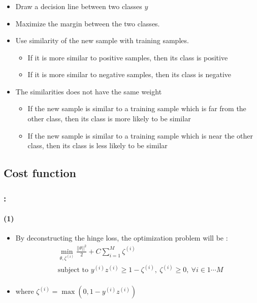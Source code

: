 \documentclass[xcolor=table]{beamer}
\begin{document}
\begin{frame}
	\frametitle{\insertshortsubtitle}
	\framesubtitle{\insertsection}
	
	\begin{minipage}{0.70\textwidth} 
		\begin{itemize}
			\item Draw a decision line between two classes $ y $ 
			\item Maximize the margin between the two classes.
			\item Use similarity of the new sample with training samples. 
			\begin{itemize}
				\item If it is more similar to positive samples, then its class is positive
				\item If it is more similar to negative samples, then its class is negative
			\end{itemize}
			\item The similarities does not have the same weight
			\begin{itemize}
				\item If the new sample is similar to a training sample which is far from the other class, then its class is more likely to be similar
				\item If the new sample is similar to a training sample which is near the other class, then its class is less likely to be similar
			\end{itemize}
		\end{itemize}
	\end{minipage}
	\begin{minipage}{0.29\textwidth} 
	\end{minipage}
	
	
\end{frame}


\subsection{Cost function}

\begin{frame}
	\frametitle{\insertshortsubtitle: \insertsection}
	\framesubtitle{\insertsubsection (1)}
	
	\begin{itemize}
		\item By deconstructing the hinge loss, the optimization problem will be :
		\begin{align*}
			& \min_{\theta, \zeta^{(i)}} \frac{||\theta||^2}{2} +  C \sum_{i=1}^{M} \zeta^{(i)} \\
			& \text{subject to } y^{(i)} z^{(i)} \ge 1 - \zeta^{(i)},\ \zeta^{(i)} \ge 0,\ \forall i \in {1 \cdots M} \\
		\end{align*}
		\item where $ \zeta^{(i)} = \max (0, 1 - y^{(i)} z^{(i)}) $
	\end{itemize}

\end{frame}
\end{document}
